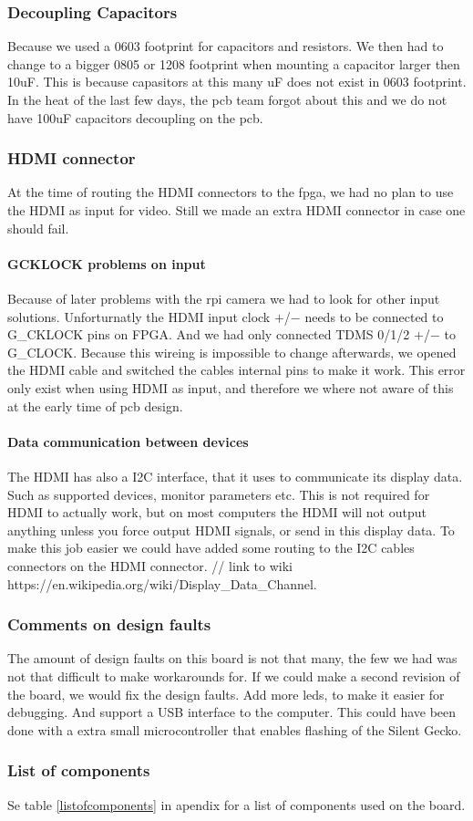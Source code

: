 \subsubsection{Decoupling Capacitors}
Because we used a 0603 footprint for capacitors and resistors.
We then had to change to a bigger 0805 or 1208 footprint when mounting a capacitor larger then 10uF.
This is because capasitors at this many uF does not exist in 0603 footprint.
In the heat of the last few days, the pcb team forgot about this and we do not have 100uF capacitors decoupling on the pcb.

\subsubsection{HDMI connector}
At the time of routing the HDMI connectors to the fpga, we had no plan to use the HDMI as input for video.
Still we made an extra HDMI connector in case one should fail.

\paragraph{GCKLOCK problems on input}
Because of later problems with the rpi camera we had to look for other input solutions.
Unforturnatly the HDMI input clock $+$/$-$ needs to be connected to G\_CKLOCK pins on FPGA.
And we had only connected TDMS 0/1/2 $+$/$-$ to G\_CLOCK.
Because this wireing is impossible to change afterwards, we opened the HDMI cable and switched the cables internal pins to make it work.
This error only exist when using HDMI as input, and therefore we where not aware of this at the early time of pcb design.

\paragraph{Data communication between devices}
The HDMI has also a I2C interface, that it uses to communicate its display data.
Such as supported devices, monitor parameters etc.
This is not required for HDMI to actually work, but on most computers the HDMI will not output anything unless you force output HDMI signals, or send in this display data.
To make this job easier we could have added some routing to the I2C cables connectors on the HDMI connector.
// link to wiki https://en.wikipedia.org/wiki/Display\_Data\_Channel.

\subsubsection{Comments on design faults}
The amount of design faults on this board is not that many, the few we had was not that difficult to make workarounds for.
If we could make a second revision of the board, we would fix the design faults.
Add more leds, to make it easier for debugging.
And support a USB interface to the computer.
This could have been done with a extra small microcontroller that enables flashing of the Silent Gecko.

\subsubsection{List of components}
Se table \ref{listofcomponents} in apendix for a list of components used on the board.

